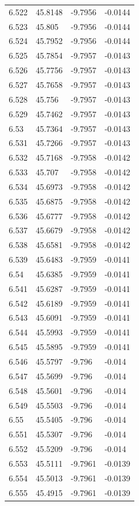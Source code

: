\begin{tabular}{llll}
6.522 & 45.8148 & -9.7956 & -0.0144 \\
6.523 & 45.805 & -9.7956 & -0.0144 \\
6.524 & 45.7952 & -9.7956 & -0.0144 \\
6.525 & 45.7854 & -9.7957 & -0.0143 \\
6.526 & 45.7756 & -9.7957 & -0.0143 \\
6.527 & 45.7658 & -9.7957 & -0.0143 \\
6.528 & 45.756 & -9.7957 & -0.0143 \\
6.529 & 45.7462 & -9.7957 & -0.0143 \\
6.53 & 45.7364 & -9.7957 & -0.0143 \\
6.531 & 45.7266 & -9.7957 & -0.0143 \\
6.532 & 45.7168 & -9.7958 & -0.0142 \\
6.533 & 45.707 & -9.7958 & -0.0142 \\
6.534 & 45.6973 & -9.7958 & -0.0142 \\
6.535 & 45.6875 & -9.7958 & -0.0142 \\
6.536 & 45.6777 & -9.7958 & -0.0142 \\
6.537 & 45.6679 & -9.7958 & -0.0142 \\
6.538 & 45.6581 & -9.7958 & -0.0142 \\
6.539 & 45.6483 & -9.7959 & -0.0141 \\
6.54 & 45.6385 & -9.7959 & -0.0141 \\
6.541 & 45.6287 & -9.7959 & -0.0141 \\
6.542 & 45.6189 & -9.7959 & -0.0141 \\
6.543 & 45.6091 & -9.7959 & -0.0141 \\
6.544 & 45.5993 & -9.7959 & -0.0141 \\
6.545 & 45.5895 & -9.7959 & -0.0141 \\
6.546 & 45.5797 & -9.796 & -0.014 \\
6.547 & 45.5699 & -9.796 & -0.014 \\
6.548 & 45.5601 & -9.796 & -0.014 \\
6.549 & 45.5503 & -9.796 & -0.014 \\
6.55 & 45.5405 & -9.796 & -0.014 \\
6.551 & 45.5307 & -9.796 & -0.014 \\
6.552 & 45.5209 & -9.796 & -0.014 \\
6.553 & 45.5111 & -9.7961 & -0.0139 \\
6.554 & 45.5013 & -9.7961 & -0.0139 \\
6.555 & 45.4915 & -9.7961 & -0.0139 \\

\end{tabular}
